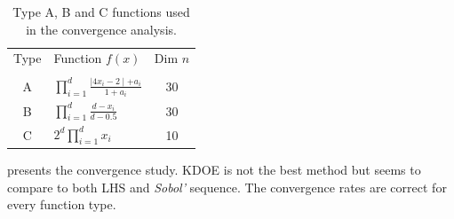 \begin{table}[!ht]
\centering
\caption{Type A, B and C functions used in the convergence analysis.}
\begin{tabular}{clc}
\toprule
Type &  Function $f(x)$ & Dim $n$\\
 &   &  \\
\midrule %
A & $\displaystyle\prod_{i=1}^d \frac{\mid 4x_i - 2 \mid + a_i}{1 + a_i}$& 30\\
B & $\displaystyle\prod_{i=1}^d \frac{d-x_i}{d-0.5}$ & 30\\
C & $2^d \displaystyle\prod_{i=1}^d x_i$ & 10\\
\bottomrule
\end{tabular}
\label{tab:conv_int}
\end{table}


 presents the convergence study. KDOE is not the best method but seems to compare to both LHS and \emph{Sobol'} sequence. The convergence rates are correct for every function type.


